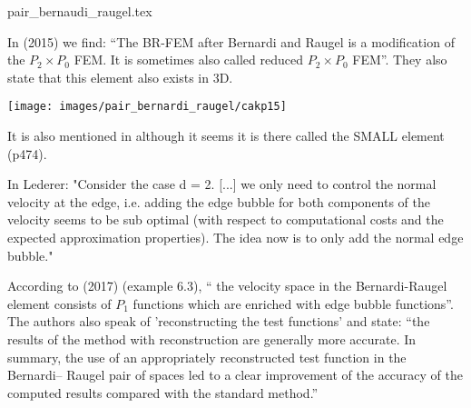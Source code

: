 \begin{flushright} {\tiny {\color{gray} pair\_bernaudi\_raugel.tex}} \end{flushright}

In \textcite{cakp15} (2015) we find: ``The BR-FEM after Bernardi and Raugel \cite{bera85} 
is a modification of the $P_2\times P_0$ FEM. It is sometimes also called reduced $P_2\times P_0$ FEM''.
They also state that this element also exists in 3D.

\begin{center}
\texttt{[image: images/pair\_bernardi\_raugel/cakp15]}
\end{center}

It is also mentioned in \textcite{bobf13} although it seems it is there called the SMALL element (p474).

In Lederer: "Consider the case d = 2. [...] we only need to control 
the normal velocity at the edge, i.e. adding the
edge bubble for both components of the velocity seems to be sub optimal (with respect to
computational costs and the expected approximation properties). The idea now is to only
add the normal edge bubble."

According to \textcite{jolm17} (2017) (example 6.3), `` the velocity space in the Bernardi-Raugel
element consists of $P_1$ functions which are enriched with edge bubble functions''.
The authors also speak of 'reconstructing the test functions' and state: 
``the results of the method with reconstruction are generally more accurate.
In summary, the use of an appropriately reconstructed test function in the Bernardi–
Raugel pair of spaces led to a clear improvement of the accuracy of the computed
results compared with the standard method.''


